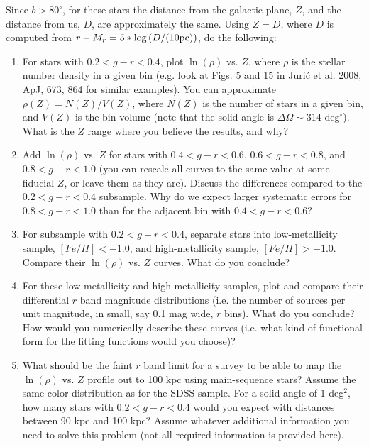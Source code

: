 Since $b>80^\circ$, for these stars the distance from the galactic plane, $Z$,
and the distance from us, $D$, are approximately the same. Using $Z=D$, where
$D$ is computed from $r-M_r= 5*\log{\left(D/({\rm 10 pc})\right)}$, do the following:
\begin{enumerate}
\item For stars with $0.2<g-r<0.4$, plot $\ln(\rho)$ vs. $Z$, where 
  $\rho$ is the stellar number density in a given bin (e.g. look at 
  Figs. 5 and 15 in Juri\'{c} et al. 2008, ApJ, 673, 864 for similar
  examples). You can approximate
  $\rho(Z) = N(Z)/V(Z)$, where $N(Z)$ is the number of stars in a given
  bin, and $V(Z)$ is the bin volume (note that the solid angle is 
  $\Delta \Omega \sim 314$ deg$^\circ$). What is the $Z$ range where you
  believe the results, and why?
\item Add $\ln(\rho)$ vs. $Z$ for stars with $0.4<g-r<0.6$, $0.6<g-r<0.8$,
      and $0.8<g-r<1.0$ (you can rescale all curves to the same value
      at some fiducial $Z$, or leave them as they are). Discuss the 
      differences compared to the $0.2<g-r<0.4$ subsample. Why do we
      expect larger systematic errors for $0.8<g-r<1.0$ than for the
      adjacent bin with $0.4<g-r<0.6$?
\item For subsample with $0.2<g-r<0.4$, separate stars into low-metallicity
      sample, $[Fe/H]<-1.0$, and high-metallicity sample, $[Fe/H]>-1.0$. 
      Compare their $\ln(\rho)$ vs. $Z$ curves. What do you conclude?
\item For these low-metallicity and high-metallicity samples, plot and 
      compare their differential $r$ band magnitude distributions (i.e. the 
      number of sources per unit magnitude, in small, say 0.1 mag wide, $r$
      bins). What do you conclude? How would you numerically describe 
      these curves (i.e. what kind of functional form for the fitting
      functions would you choose)? 
\item What should be the faint $r$ band limit for a survey to be able to
      map the $\ln(\rho)$ vs. $Z$ profile out to 100 kpc using main-sequence
      stars? Assume the same color distribution as for the SDSS sample. 
      For a solid angle of 1 deg$^2$, how many stars with $0.2<g-r<0.4$
      would you expect with distances between 90 kpc and 100 kpc? 
      Assume whatever additional information you need to solve this 
      problem (not all required information is provided here).
\end{enumerate}






